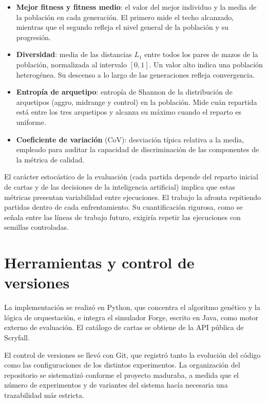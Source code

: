 \begin{itemize}
    \item \textbf{Mejor fitness y fitness medio}: el valor del mejor individuo y la media de la población en cada generación. El primero mide el techo alcanzado, mientras que el segundo refleja el nivel general de la población y su progresión.
    \item \textbf{Diversidad}: media de las distancias $L_1$ entre todos los pares de mazos de la población, normalizada al intervalo $[0, 1]$. Un valor alto indica una población heterogénea. Su descenso a lo largo de las generaciones refleja convergencia.
    \item \textbf{Entropía de arquetipo}: entropía de Shannon de la distribución de arquetipos (aggro, midrange y control) en la población. Mide cuán repartida está entre los tres arquetipos y alcanza su máximo cuando el reparto es uniforme.
    \item \textbf{Coeficiente de variación} (CoV): desviación típica relativa a la media, empleado para auditar la capacidad de discriminación de las componentes de la métrica de calidad.
\end{itemize}

El carácter estocástico de la evaluación (cada partida depende del reparto inicial de cartas y de las decisiones de la inteligencia artificial) implica que estas métricas presentan variabilidad entre ejecuciones. El trabajo la afronta repitiendo partidas dentro de cada enfrentamiento. Su cuantificación rigurosa, como se señala entre las líneas de trabajo futuro, exigiría repetir las ejecuciones con semillas controladas.

\section{Herramientas y control de versiones}

La implementación se realizó en Python, que concentra el algoritmo genético y la lógica de orquestación, e integra el simulador Forge, escrito en Java, como motor externo de evaluación. El catálogo de cartas se obtiene de la API pública de Scryfall.

El control de versiones se llevó con Git, que registró tanto la evolución del código como las configuraciones de los distintos experimentos. La organización del repositorio se sistematizó conforme el proyecto maduraba, a medida que el número de experimentos y de variantes del sistema hacía necesaria una trazabilidad más estricta.

